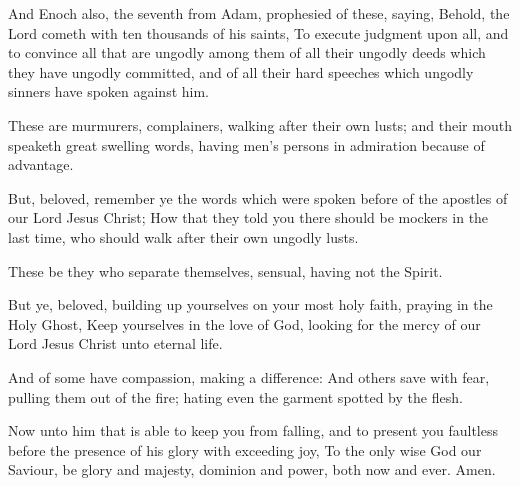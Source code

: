 \Verse And Enoch also, the seventh from Adam, prophesied of these, saying, Behold, the Lord cometh with ten thousands of his saints, \Verse To execute judgment upon all, and to convince all that are ungodly among them of all their ungodly deeds which they have ungodly committed, and of all their hard speeches which ungodly sinners have spoken against him.

\Verse These are murmurers, complainers, walking after their own lusts; and their mouth speaketh great swelling words, having men's persons in admiration because of advantage.

\Verse But, beloved, remember ye the words which were spoken before of the apostles of our Lord Jesus Christ; \Verse How that they told you there should be mockers in the last time, who should walk after their own ungodly lusts.

\Verse These be they who separate themselves, sensual, having not the Spirit.

\Verse But ye, beloved, building up yourselves on your most holy faith, praying in the Holy Ghost, \Verse Keep yourselves in the love of God, looking for the mercy of our Lord Jesus Christ unto eternal life.

\Verse And of some have compassion, making a difference: \Verse And others save with fear, pulling them out of the fire; hating even the garment spotted by the flesh.

\Verse Now unto him that is able to keep you from falling, and to present you faultless before the presence of his glory with exceeding joy, \Verse To the only wise God our Saviour, be glory and majesty, dominion and power, both now and ever. Amen.

